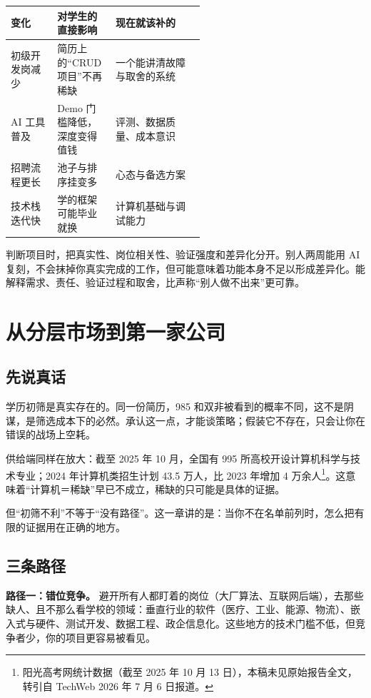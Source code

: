 \documentclass[UTF8,zihao=5,openany]{ctexbook}
\begin{document}
\begin{center}\small
\begin{tabularx}{\linewidth}{p{0.24\linewidth}p{0.30\linewidth}Y}
\toprule
变化 & 对学生的直接影响 & 现在就该补的 \\
\midrule
初级开发岗减少 & 简历上的“CRUD 项目”不再稀缺 & 一个能讲清故障与取舍的系统 \\
AI 工具普及 & Demo 门槛降低，深度变得值钱 & 评测、数据质量、成本意识 \\
招聘流程更长 & 池子与排序挂变多 & 心态与备选方案 \\
技术栈迭代快 & 学的框架可能毕业就换 & 计算机基础与调试能力 \\
\bottomrule
\end{tabularx}
\end{center}

判断项目时，把真实性、岗位相关性、验证强度和差异化分开。别人两周能用 AI 复刻，不会抹掉你真实完成的工作，但可能意味着功能本身不足以形成差异化。能解释需求、责任、验证过程和取舍，比声称“别人做不出来”更可靠。


\clearpage\chapter{从分层市场到第一家公司}
\section{先说真话}
学历初筛是真实存在的。同一份简历，985 和双非被看到的概率不同，这不是阴谋，是筛选成本下的必然。承认这一点，才能谈策略；假装它不存在，只会让你在错误的战场上空耗。

供给端同样在放大：截至 2025 年 10 月，全国有 995 所高校开设计算机科学与技术专业；2024 年计算机类招生计划 43.5 万人，比 2023 年增加 4 万余人\footnote{阳光高考网统计数据（截至 2025 年 10 月 13 日），本稿未见原始报告全文，转引自 TechWeb 2026 年 7 月 6 日报道。}。这意味着“计算机＝稀缺”早已不成立，稀缺的只可能是具体的证据。

但“初筛不利”不等于“没有路径”。这一章讲的是：当你不在名单前列时，怎么把有限的证据用在正确的地方。

\section{三条路径}
\textbf{路径一：错位竞争。} 避开所有人都盯着的岗位（大厂算法、互联网后端），去那些缺人、且不那么看学校的领域：垂直行业的软件（医疗、工业、能源、物流）、嵌入式与硬件、测试开发、数据工程、政企信息化。这些地方的技术门槛不低，但竞争者少，你的项目更容易被看见。
\end{document}
